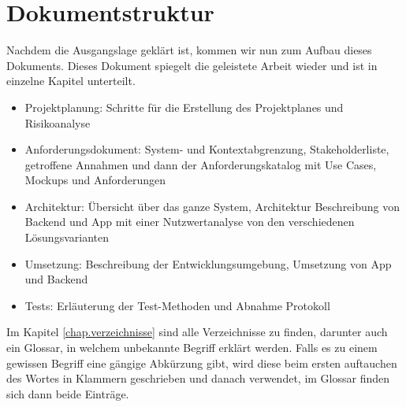 \section{Dokumentstruktur}\label{nicht_ziele}
Nachdem die Ausgangslage geklärt ist, kommen wir nun zum Aufbau dieses Dokuments. Dieses Dokument spiegelt die geleistete Arbeit wieder und ist in einzelne Kapitel unterteilt.
\begin{itemize}
\item Projektplanung: Schritte für die Erstellung des Projektplanes und Risikoanalyse
\item Anforderungsdokument: System- und Kontextabgrenzung, Stakeholderliste, getroffene Annahmen und dann der Anforderungskatalog mit Use Cases, Mockups und Anforderungen
\item Architektur: Übersicht über das ganze System, Architektur Beschreibung von Backend und App mit einer Nutzwertanalyse von den verschiedenen Lösungsvarianten
\item Umsetzung: Beschreibung der Entwicklungsumgebung, Umsetzung von App und Backend
\item Tests: Erläuterung der Test-Methoden und Abnahme Protokoll
\end{itemize}

Im Kapitel \ref{chap.verzeichnisse} sind alle Verzeichnisse zu finden, darunter auch ein Glossar, in welchem unbekannte Begriff erklärt werden. Falls es zu einem gewissen Begriff eine gängige Abkürzung gibt, wird diese beim ersten auftauchen des Wortes in Klammern geschrieben und danach verwendet, im Glossar finden sich dann beide Einträge.

